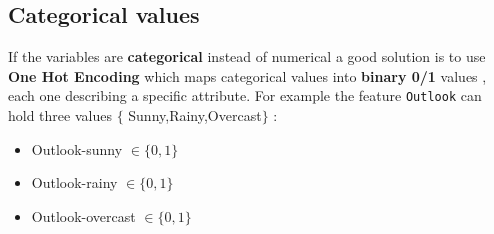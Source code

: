 \subsection{Categorical values}
If the variables are \textbf{categorical} instead of numerical a good solution is to use \textbf{One Hot Encoding} which maps categorical values into \textbf{binary 0/1} values , each one describing a specific attribute. 
For example the feature \texttt{Outlook} can hold three values $\{$ Sunny,Rainy,Overcast$\}$  : 
\begin{itemize}
\item Outlook-sunny $\in \{ 0,1\}$
\item Outlook-rainy $\in \{ 0,1\}$
\item Outlook-overcast $\in \{ 0,1\}$
\end{itemize}


